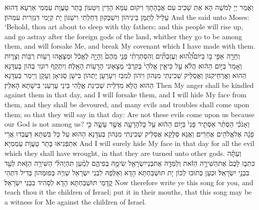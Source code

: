 {וַאֲמַר יְיָ לְמֹשֶׁה הָא אַתְּ שָׁכֵיב עִם אֲבָהָתָךְ וִיקוּם עַמָּא הָדֵין וְיִטְעוֹן בָּתַר טָעֲוָת עַמְמֵי אַרְעָא דְּהוּא עָלֵיל לְתַמָּן בֵּינֵיהוֹן וְיִשְׁבְּקוּן דַּחְלְתִי וִישַׁנּוֹן יָת קְיָמִי דִּגְזַרִית עִמְּהוֹן׃}
{And the \lord\space said unto Moses: ‘Behold, thou art about to sleep with thy fathers; and this people will rise up, and go astray after the foreign gods of the land, whither they go to be among them, and will forsake Me, and break My covenant which I have made with them.}{}
{וְחָרָ֣ה אַפִּ֣י ב֣וֹ בַיּוֹם\maqqaf הַ֠ה֠וּא וַעֲזַבְתִּ֞ים וְהִסְתַּרְתִּ֨י פָנַ֤י מֵהֶם֙ וְהָיָ֣ה לֶאֱכֹ֔ל וּמְצָאֻ֛הוּ רָע֥וֹת רַבּ֖וֹת וְצָר֑וֹת וְאָמַר֙ בַּיּ֣וֹם הַה֔וּא הֲלֹ֗א עַ֣ל כִּי\maqqaf אֵ֤ין אֱלֹהַי֙ בְּקִרְבִּ֔י מְצָא֖וּנִי הָרָע֥וֹת הָאֵֽלֶּה׃}
{וְיִתְקַף רוּגְזִי בְהוֹן בְּעִדָּנָא הַהוּא וַאֲרַחֵיקִנּוּן וַאֲסַלֵּיק שְׁכִינְתִי מִנְּהוֹן וִיהוֹן לְמִבַּז וִיעָרְעָן יָתְהוֹן בִּישָׁן סַגִּיאָן וְעָקָן וְיֵימַר בְּעִדָּנָא הַהוּא הֲלָא מִדְּלֵית שְׁכִינַת אֱלָהִי בֵּינַי עָרְעַנִי בִּישָׁתָא הָאִלֵּין׃}
{Then My anger shall be kindled against them in that day, and I will forsake them, and I will hide My face from them, and they shall be devoured, and many evils and troubles shall come upon them; so that they will say in that day: Are not these evils come upon us because our God is not among us?}{}
{וְאָנֹכִ֗י הַסְתֵּ֨ר אַסְתִּ֤יר פָּנַי֙ בַּיּ֣וֹם הַה֔וּא עַ֥ל כׇּל\maqqaf הָרָעָ֖ה אֲשֶׁ֣ר עָשָׂ֑ה כִּ֣י פָנָ֔ה אֶל\maqqaf אֱלֹהִ֖ים אֲחֵרִֽים׃}
{וַאֲנָא סַלָּקָא אֲסַלֵּיק שְׁכִינְתִי מִנְּהוֹן בְּעִדָּנָא הַהוּא עַל כָּל בִּשְׁתָּא דַּעֲבַדוּ אֲרֵי אִתְפְּנִיאוּ בָּתַר טָעֲוָת עַמְמַיָּא׃}
{And I will surely hide My face in that day for all the evil which they shall have wrought, in that they are turned unto other gods.}{}
{וְעַתָּ֗ה כִּתְב֤וּ לָכֶם֙ אֶת\maqqaf הַשִּׁירָ֣ה הַזֹּ֔את וְלַמְּדָ֥הּ אֶת\maqqaf בְּנֵי\maqqaf יִשְׂרָאֵ֖ל שִׂימָ֣הּ בְּפִיהֶ֑ם לְמַ֨עַן תִּהְיֶה\maqqaf לִּ֜י הַשִּׁירָ֥ה הַזֹּ֛את לְעֵ֖ד בִּבְנֵ֥י יִשְׂרָאֵֽל׃}
{וּכְעַן כְּתוּבוּ לְכוֹן יָת תּוּשְׁבַּחְתָּא הָדָא וְאַלְּפַהּ לִבְנֵי יִשְׂרָאֵל שַׁוְיַהּ בְּפוּמְּהוֹן בְּדִיל דִּתְהֵי קֳדָמַי תּוּשְׁבַּחְתָּא הָדָא לְסָהִיד בִּבְנֵי יִשְׂרָאֵל׃}
{Now therefore write ye this song for you, and teach thou it the children of Israel; put it in their mouths, that this song may be a witness for Me against the children of Israel.}{}
